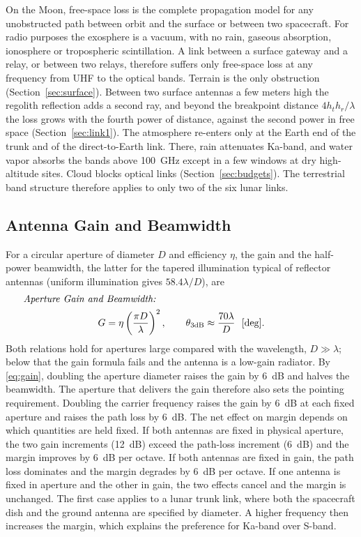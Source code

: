 \documentclass{IEEEoj}
\newcommand{\eqname}[1]{\makebox[\linewidth][l]{\hspace{1em}\textit{#1:}}\notag}
\begin{document}
On the Moon, free-space loss is the complete propagation model for any unobstructed path between orbit and the surface or between two spacecraft. For radio purposes the exosphere is a vacuum, with no rain, gaseous absorption, ionosphere or tropospheric scintillation. A link between a surface gateway and a relay, or between two relays, therefore suffers only free-space loss at any frequency from UHF to the optical bands. Terrain is the only obstruction (Section~\ref{sec:surface}). Between two surface antennas a few meters high the regolith reflection adds a second ray, and beyond the breakpoint distance $4h_th_r/\lambda$ the loss grows with the fourth power of distance, against the second power in free space (Section~\ref{sec:link1}). The atmosphere re-enters only at the Earth end of the trunk and of the direct-to-Earth link. There, rain attenuates Ka-band, and water vapor absorbs the bands above \SI{100}{GHz} except in a few windows at dry high-altitude sites. Cloud blocks optical links (Section~\ref{sec:budgets}). The terrestrial band structure therefore applies to only two of the six lunar links.

\subsection{Antenna Gain and Beamwidth}
\label{sec:gain}

For a circular aperture of diameter $D$ and efficiency $\eta$, the gain and the half-power beamwidth, the latter for the tapered illumination typical of reflector antennas (uniform illumination gives $58.4\lambda/D$), are
\begin{gather}
\eqname{Aperture Gain and Beamwidth}\\
G = \eta \left(\frac{\pi D}{\lambda}\right)^{2}, \qquad \theta_{3\mathrm{dB}} \approx \frac{70\lambda}{D} \ \ [\mathrm{deg}].
\label{eq:gain}
\end{gather}
Both relations hold for apertures large compared with the wavelength, $D \gg \lambda$; below that the gain formula fails and the antenna is a low-gain radiator. By \eqref{eq:gain}, doubling the aperture diameter raises the gain by \SI{6}{dB} and halves the beamwidth. The aperture that delivers the gain therefore also sets the pointing requirement. Doubling the carrier frequency raises the gain by \SI{6}{dB} at each fixed aperture and raises the path loss by \SI{6}{dB}. The net effect on margin depends on which quantities are held fixed. If both antennas are fixed in physical aperture, the two gain increments (\SI{12}{dB}) exceed the path-loss increment (\SI{6}{dB}) and the margin improves by \SI{6}{dB} per octave. If both antennas are fixed in gain, the path loss dominates and the margin degrades by \SI{6}{dB} per octave. If one antenna is fixed in aperture and the other in gain, the two effects cancel and the margin is unchanged. The first case applies to a lunar trunk link, where both the spacecraft dish and the ground antenna are specified by diameter. A higher frequency then increases the margin, which explains the preference for Ka-band over S-band.
\end{document}

